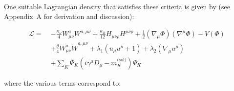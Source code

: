 \documentclass[10pt,reprint,aps,onecolumn,nofootinbib]{revtex4-2}
\begin{document}
One suitable Lagrangian density that satisfies these criteria is given by (see Appendix~A for derivation and discussion):

\begin{align}
\mathcal{L} =\; & -\frac{\kappa_\omega}{4} W^{a}_{\mu\nu} W^{a,\mu\nu}
    + \frac{\kappa_B}{12} H_{\mu\nu\rho} H^{\mu\nu\rho}
    + \frac{1}{2} (\nabla_\mu \Phi)(\nabla^\mu \Phi)
    - V(\Phi) \nonumber \\
& + \frac{\theta}{4} W^{a}_{\mu\nu} \tilde{W}^{a,\mu\nu}
    + \lambda_1 (u_\mu u^\mu + 1)
    + \lambda_2 (\nabla_\mu u^\mu) \nonumber \\
& + \sum_{K} \bar{\Psi}_K \left( i\gamma^\mu D_\mu - m^{\text{(sol)}}_K \right) \Psi_K
\label{eq:Lagrangian}
\end{align}

where the various terms correspond to:
\end{document}
